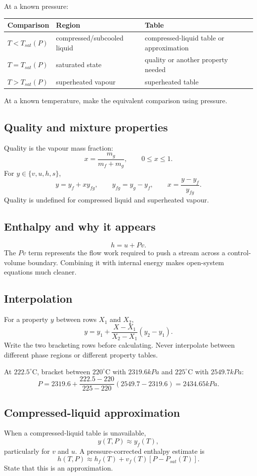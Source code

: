 \documentclass[10pt,a4paper]{article}
\begin{document}
At a known pressure:
\begin{center}
\begin{tabular}{lll}\toprule
Comparison & Region & Table\\\midrule
$T<T_{sat}(P)$ & compressed/subcooled liquid & compressed-liquid table or approximation\\
$T=T_{sat}(P)$ & saturated state & quality or another property needed\\
$T>T_{sat}(P)$ & superheated vapour & superheated table\\\bottomrule
\end{tabular}
\end{center}
At a known temperature, make the equivalent comparison using pressure.

\subsection{Quality and mixture properties}
Quality is the vapour mass fraction:
\[
x=\frac{m_g}{m_f+m_g},\qquad 0\le x\le1.
\]
For $y\in\{v,u,h,s\}$,
\[
y=y_f+xy_{fg},\qquad y_{fg}=y_g-y_f,
\qquad x=\frac{y-y_f}{y_{fg}}.
\]
Quality is undefined for compressed liquid and superheated vapour.

\subsection{Enthalpy and why it appears}
\[
h=u+Pv.
\]
The $Pv$ term represents the flow work required to push a stream across a control-volume boundary. Combining it with internal energy makes open-system equations much cleaner.

\subsection{Interpolation}
For a property $y$ between rows $X_1$ and $X_2$,
\[
y=y_1+\frac{X-X_1}{X_2-X_1}(y_2-y_1).
\]
Write the two bracketing rows before calculating. Never interpolate between different phase regions or different property tables.

\begin{example}
At $222.5^\circ$C, bracket between $220^\circ$C with $2319.6\unit{kPa}$ and $225^\circ$C with $2549.7\unit{kPa}$:
\[
P=2319.6+\frac{222.5-220}{225-220}(2549.7-2319.6)=2434.65\unit{kPa}.
\]
\end{example}

\subsection{Compressed-liquid approximation}
When a compressed-liquid table is unavailable,
\[
y(T,P)\approx y_f(T),
\]
particularly for $v$ and $u$. A pressure-corrected enthalpy estimate is
\[
h(T,P)\approx h_f(T)+v_f(T)[P-P_{sat}(T)].
\]
State that this is an approximation.
\end{document}

